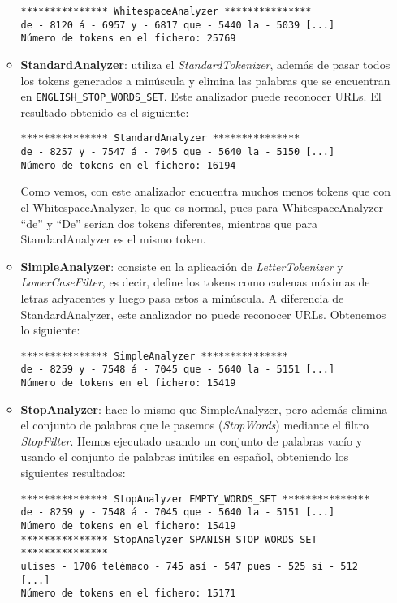\begin{enumerate}
\begin{itemize}
	\texttt{*************** WhitespaceAnalyzer ***************\\de - 8120		á - 6957		y - 6817		que - 5440		la - 5039		[...]\\	Número de tokens en el fichero: 25769}\\
	
	\item \textbf{StandardAnalyzer}: utiliza el \textit{StandardTokenizer}, además de pasar todos los tokens generados a minúscula y elimina las palabras que se encuentran en \texttt{ENGLISH\_STOP\_WORDS\_SET}. Este analizador puede reconocer URLs. El resultado obtenido es el siguiente:
	
	\texttt{*************** StandardAnalyzer ***************\\de - 8257		y - 7547		á - 7045		que - 5640		la - 5150		[...]\\Número de tokens en el fichero: 16194}
	
	Como vemos, con este analizador encuentra muchos menos tokens que con el WhitespaceAnalyzer, lo que es normal, pues para WhitespaceAnalyzer ``de'' y ``De'' serían dos tokens diferentes, mientras que para StandardAnalyzer es el mismo token.\\
	
	\item \textbf{SimpleAnalyzer}: consiste en la aplicación de \textit{LetterTokenizer} y  \textit{LowerCaseFilter}, es decir, define los tokens como cadenas máximas de letras adyacentes y luego pasa estos a minúscula. A diferencia de StandardAnalyzer, este analizador no puede reconocer URLs. Obtenemos lo siguiente:
	
	\texttt{*************** SimpleAnalyzer ***************\\de - 8259		y - 7548		á - 7045		que - 5640		la - 5151		[...]\\Número de tokens en el fichero: 15419}\\
	
	\item \textbf{StopAnalyzer}: hace lo mismo que SimpleAnalyzer, pero además elimina el conjunto de palabras que le pasemos (\textit{StopWords}) mediante el filtro \textit{StopFilter}. Hemos ejecutado usando un conjunto de palabras vacío y usando el conjunto de palabras inútiles en español, obteniendo los siguientes resultados:
	
	\texttt{*************** StopAnalyzer EMPTY\_WORDS\_SET ***************\\de - 8259		y - 7548		á - 7045		que - 5640		la - 5151		[...]\\Número de tokens en el fichero: 15419\\
	*************** StopAnalyzer SPANISH\_STOP\_WORDS\_SET ***************\\ulises - 1706		telémaco - 745		así - 547		pues - 525		si - 512		[...]\\Número de tokens en el fichero: 15171}
	

\end{itemize}
\end{enumerate}
